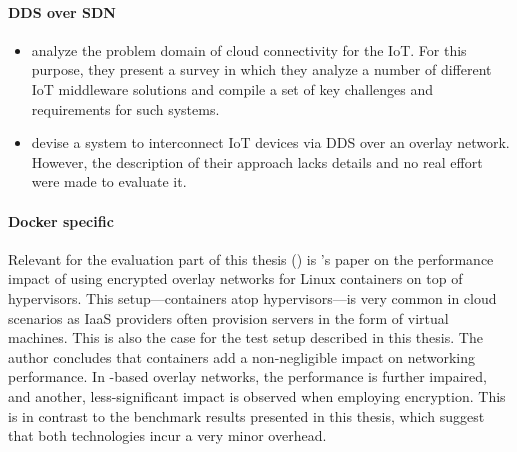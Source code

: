 \paragraph{DDS over SDN}
\begin{itemize}
	\item \citeauthor*{farahzadi2017middleware} \cite{farahzadi2017middleware} analyze the problem domain of cloud connectivity for the IoT. For this purpose, they present a survey in which they analyze a number of different IoT middleware solutions and compile a set of key challenges and requirements for such systems.
	\item \citeauthor*{hakiri2015publish} \cite{hakiri2015publish} devise a system to interconnect IoT devices via DDS over an overlay network. However, the description of their approach lacks details and no real effort were made to evaluate it.
\end{itemize}


\paragraph{Docker specific}
Relevant for the evaluation part of this thesis () is \citeauthor*{kratzke2017microservices}'s paper \cite{kratzke2017microservices} on the performance impact of using encrypted overlay networks for Linux containers on top of hypervisors. This setup---containers atop hypervisors---is very common in cloud scenarios as IaaS providers often provision servers in the form of virtual machines. This is also the case for the test setup described in this thesis. The author concludes that containers add a non-negligible impact on networking performance. In \wnet -based overlay networks, the performance is further impaired, and another, less-significant impact is observed when employing encryption. This is in contrast to the benchmark results presented in this thesis, which suggest that both technologies incur a very minor overhead.




